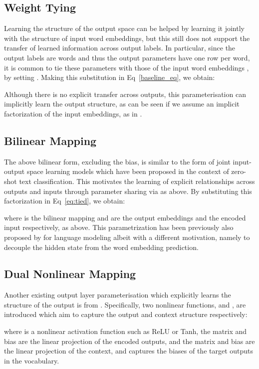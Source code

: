 \documentclass{article}
\begin{document}
\subsection{Weight Tying} Learning the structure of the output space can be helped by learning it jointly with the structure of input word embeddings, but this still does not support the transfer of learned information across output labels.  In particular, since the output labels are words and thus the output parameters  have one row per word, it is common to tie these parameters with those of the input word embeddings , by setting  \cite{inan2016tying,press17}. 
Making this substitution in Eq~\ref{baseline_eq}, we obtain: 
 
Although there is no explicit transfer across outputs, this parameterisation can implicitly learn the output structure, as can be seen if we assume an implicit factorization of the input embeddings,  as in \cite{mikolov13}.

\subsection{Bilinear Mapping}  
The above bilinear form, excluding the bias, is similar to the form of joint input-output space learning models \cite{yazhen15,nam16} which have been proposed in the context of zero-shot text classification. This motivates the learning of explicit relationships across outputs and inputs through parameter sharing via  as above. By substituting this factorization in Eq~\ref{eq:tied}, we obtain: 
 
where  is the bilinear mapping and  are the output embeddings and the encoded input respectively, as above. This parametrization has been previously also proposed by \citet{gulordava18} for language modeling albeit with a different motivation, namely to decouple the hidden state from the word embedding prediction.

\subsection{Dual Nonlinear Mapping} \label{joint} Another existing output layer parameterisation which explicitly learns the structure of the output is from \cite{pappas18}. Specifically, two nonlinear functions,  and , are introduced which aim to capture the output and context structure respectively: 

\noindent where  is a nonlinear activation function such as ReLU or Tanh, the matrix  and bias  are the linear projection of the encoded outputs, and the matrix  and bias  are the linear projection of the context, and  captures the biases of the target outputs in the vocabulary.
\end{document}
